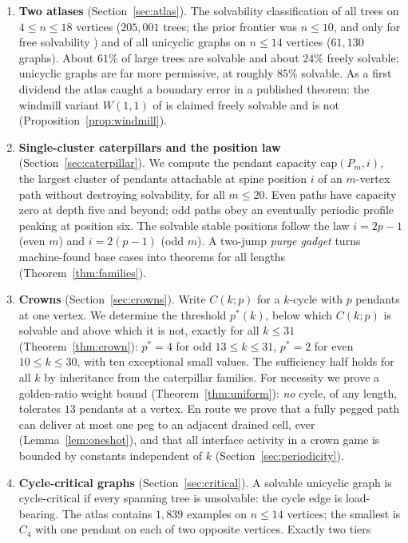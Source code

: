 \documentclass[11pt]{article}
\theoremstyle{definition}
\newcommand{\cp}{\mathrm{cap}}
\begin{document}
\begin{enumerate}
\item \textbf{Two atlases} (Section~\ref{sec:atlas}). The solvability
classification of all trees on $4\le n\le 18$ vertices ($205{,}001$
trees; the prior frontier was $n\le 10$, and only for free
solvability \cite{BG13}) and of all unicyclic graphs on $n\le 14$
vertices ($61{,}130$ graphs). About $61\%$ of large trees are
solvable and about $24\%$ freely solvable; unicyclic graphs are far
more permissive, at roughly $85\%$ solvable. As a first dividend the
atlas caught a boundary error in a published theorem: the windmill
variant $W(1,1)$ of \cite{BH12} is claimed freely solvable and is
not (Proposition~\ref{prop:windmill}).
\item \textbf{Single-cluster caterpillars and the position law}
(Section~\ref{sec:caterpillar}). We compute the pendant capacity
$\cp(P_m,i)$, the largest cluster of pendants attachable at spine
position $i$ of an $m$-vertex path without destroying solvability,
for all $m\le 20$. Even paths have capacity zero at depth five and
beyond; odd paths obey an eventually periodic profile peaking at
position six. The solvable stable positions follow the law $i=2p-1$
(even $m$) and $i=2(p-1)$ (odd $m$). A two-jump \emph{purge gadget}
turns machine-found base cases into theorems for all lengths
(Theorem~\ref{thm:families}).
\item \textbf{Crowns} (Section~\ref{sec:crowns}). Write $C(k;p)$ for
a $k$-cycle with $p$ pendants at one vertex. We determine the
threshold $p^*(k)$, below which $C(k;p)$ is solvable and above which
it is not, exactly for all $k\le 31$
(Theorem~\ref{thm:crown}): $p^*=4$ for odd $13\le k\le 31$, $p^*=2$
for even $10\le k\le 30$, with ten exceptional small values. The
sufficiency half holds for all $k$ by inheritance from the
caterpillar families. For necessity we prove a golden-ratio weight
bound (Theorem~\ref{thm:uniform}): \emph{no} cycle, of any length,
tolerates $13$ pendants at a vertex. En route we prove that a
fully pegged path can deliver at most one peg to an adjacent drained
cell, ever (Lemma~\ref{lem:oneshot}), and that all interface
activity in a crown game is bounded by constants independent of $k$
(Section~\ref{sec:periodicity}).
\item \textbf{Cycle-critical graphs} (Section~\ref{sec:critical}). A
solvable unicyclic graph is cycle-critical if every spanning tree is
unsolvable: the cycle edge is load-bearing. The atlas contains
$1{,}839$ examples on $n\le 14$ vertices; the smallest is $C_4$ with
one pendant on each of two opposite vertices. Exactly two tiers

\end{enumerate}
\end{document}
